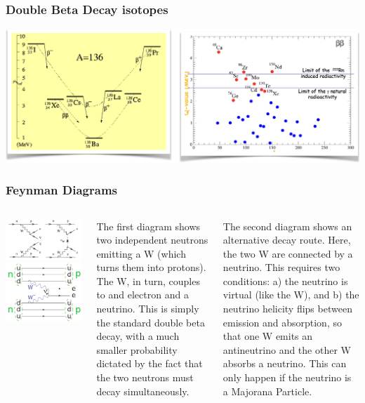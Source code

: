 \begin{frame}
\frametitle{Double Beta Decay isotopes}
\includegraphics[scale=0.35]{img/BBIsotopes.png}
\end{frame}

\begin{frame}
\frametitle{Feynman Diagrams}
\begin{columns}
\includegraphics[scale=0.15]{img/feynman2.png}
\includegraphics[scale=0.35]{img/250px-Double_beta_decay_feynman.svg.png}
 
The first diagram shows two independent neutrons emitting a W (which turns them into protons). The W, in turn, couples to and electron and a neutrino. This is simply the standard double beta decay, with a much smaller probability dictated by the fact that the two neutrons must decay simultaneously.  

The second diagram shows an alternative decay route. Here, the two W are connected by a neutrino. This requires two conditions: a) the neutrino is virtual (like the W), and b) the neutrino helicity flips between emission and absorption, so that one W emits an antineutrino and the other W absorbs a neutrino. This can only happen if the neutrino is a Majorana Particle. 
\end{columns}
\end{frame}


